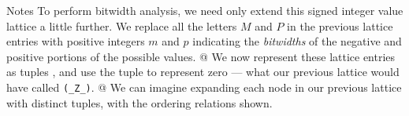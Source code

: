 \documentclass[%
pdf,
colorBG,
slideColor,
nototal,
oqe
]{prosper}
\newenvironment{talknotes}{\begin{slide}{Notes}\tiny}{\end{slide}}
\begin{document}

\begin{talknotes}
To perform bitwidth analysis, we need only extend this signed integer
value lattice a little further.  We replace all the letters $M$ and
$P$ in the previous lattice entries with positive integers $m$ and $p$
indicating the \emph{bitwidths} of the negative and positive portions
of the possible values.  @ We now represent these lattice entries as
tuples , and use the  tuple to represent zero ---
what our previous lattice would have called {\tt (\_Z\_)}.  @ We can
imagine expanding each node in our previous lattice with distinct
tuples, with the ordering relations shown.
\end{talknotes}
\end{document}
